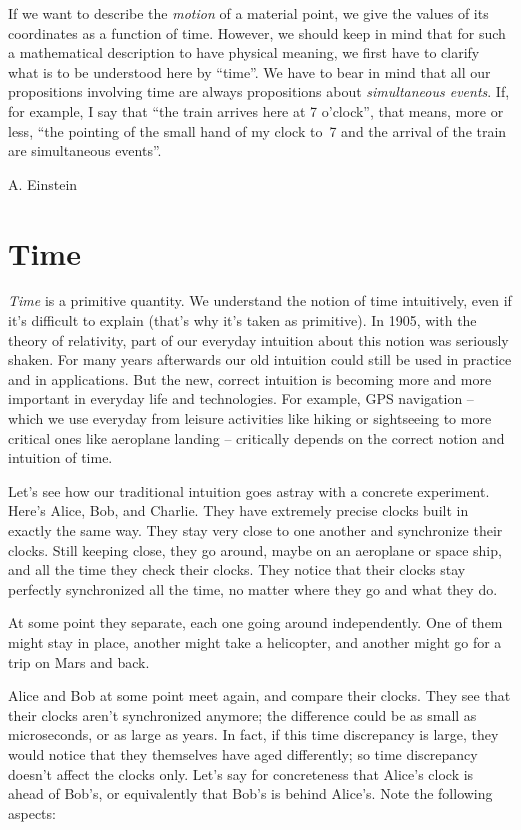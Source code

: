 \documentclass[a4paper,12pt,%
onecolumn,oneside,titlepage,%
british%
]{memoir}
\renewcommand*{\|}[1][]{\nonscript\:#1\vert\nonscript\:\mathopen{}}
\begin{document}
\epigraph{If we want to describe the \emph{motion} of a material point, we give the values of its coordinates as a function of time. However, we should keep in mind that for such a mathematical description to have physical meaning, we first have to clarify what is to be understood here by \enquote{time}. We have to bear in mind that all our propositions involving time are always propositions about \emph{simultaneous events}. If, for example, I say that \enquote{the train arrives here at 7 o'clock}, that means, more or less, \enquote{the pointing of the small hand of my clock to~7 and the arrival of the train are simultaneous events}.}{A. Einstein \cites*{einstein1905c}}

\section{Time}
\label{sec:time}

\emph{Time} is a primitive quantity. We understand the notion of time intuitively, even if it's difficult to explain (that's why it's taken as primitive). In 1905, with the theory of relativity, part of our everyday intuition about this notion was seriously shaken. For many years afterwards our old intuition could still be used in practice and in applications. But the new, correct intuition is becoming more and more important in everyday life and technologies. For example, GPS navigation -- which we use everyday from leisure activities like hiking or sightseeing to more critical ones like aeroplane landing -- critically depends on the correct notion and intuition of time.

Let's see how our traditional intuition goes astray with a concrete experiment. Here's Alice, Bob, and Charlie. They have extremely precise clocks built in exactly the same way. They stay very close to one another and synchronize their clocks. Still keeping close, they go around, maybe on an aeroplane or space ship, and all the time they check their clocks. They notice that their clocks stay perfectly synchronized all the time, no matter where they go and what they do.

At some point they separate, each one going around independently. One of them might stay in place, another might take a helicopter, and another might go for a trip on Mars and back.

Alice and Bob at some point meet again, and compare their clocks. They see that their clocks aren't synchronized anymore; the difference could be as small as microseconds, or as large as years. In fact, if this time discrepancy is large, they would notice that they themselves have aged differently; so time discrepancy doesn't affect the clocks only. Let's say for concreteness that Alice's clock is ahead of Bob's, or equivalently that Bob's is behind Alice's. Note the following aspects:
\end{document}
